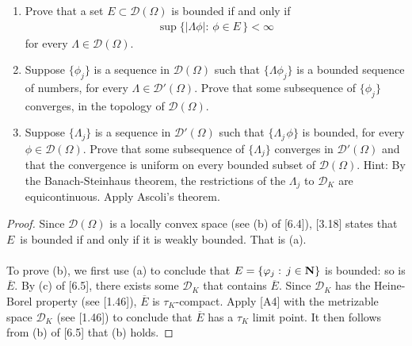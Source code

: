 %
%
{\it
\begin{enumerate}[item-label=(\alph{enumi})]
\item Prove that a set $E\subset \mathcal{D}(\Omega)$ is bounded if and only if
%
\begin{align*}
  \sup \{\lvert\Lambda \phi\rvert:\, \phi \in E\,\}< \infty
\end{align*}
%
for every $\Lambda \in \mathcal{D}(\Omega)$.
\item Suppose $\{\phi_j\}$ is a sequence in $\mathcal{D}(\Omega)$ such that $\{\Lambda \phi_j\}$ is a bounded sequence of %
numbers, for every $\Lambda \in \mathcal{D}'(\Omega)$. Prove that some subsequence of $\{\phi_j\}$ converges, in the %
topology of $\mathcal{D}(\Omega)$.
\item Suppose $\{\Lambda _j\}$ is a sequence in $\mathcal{D}'(\Omega)$ such that $\{\Lambda_{j\,} \phi\}$ is bounded, for %
every $\phi \in \mathcal{D}(\Omega)$. Prove that some subsequence of $\{\Lambda _j\}$ converges in $\mathcal{D}'(\Omega)$ %
and that the convergence is uniform on every bounded subset of $\mathcal{D}(\Omega)$. Hint: By the Banach-Steinhaus %
theorem, the restrictions of the $\Lambda_j$ to $\mathcal{D}_K$ are equicontinuous. Apply Ascoli's theorem.
\end{enumerate}}
%
\begin{proof}
Since $\mathcal{D}(\Omega)$ is a locally convex space (see (b) of [6.4]), [3.18] states that $E\,$ is bounded if and only if %
it is weakly bounded. That is (a). \\
\\
To prove (b), we first use (a) to conclude that $E= \{\varphi_j:\, j\in \mathbf{N}\}$ is bounded: so is $\overline{E}$. By (c) of %
[6.5], there exists some $\mathcal{D}_K$ that contains $\overline{E}$. Since $\mathcal{D}_K$ has the Heine-Borel property %
(see [1.46]), $\overline{E}$ is $\tau_K$-compact. Apply [A4] with the metrizable space $\mathcal{D}_K$ (see [1.46]) to %
conclude that $\overline{E}$ has a $\tau_K$ limit point. It then follows from (b) of [6.5] that (b) holds.
\end{proof}
% 